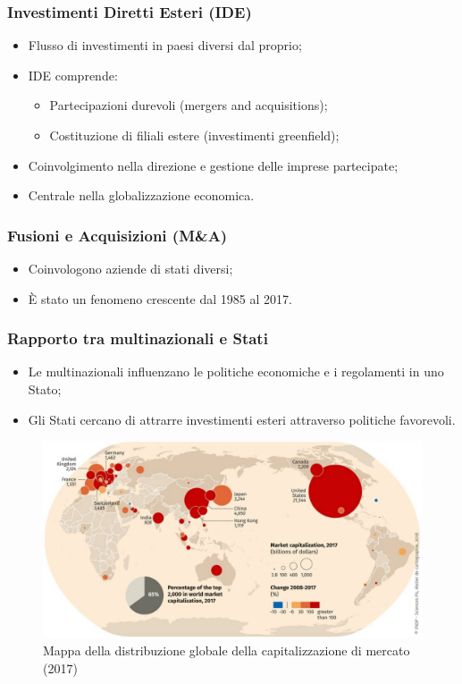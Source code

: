 \documentclass{article}
\begin{document}
\subsubsection{Investimenti Diretti Esteri (IDE)}
\begin{itemize}
    \item Flusso di investimenti in paesi diversi dal proprio;
    \item IDE comprende:
        \begin{itemize}
            \item Partecipazioni durevoli (mergers and acquisitions);
            \item Costituzione di filiali estere (investimenti greenfield);
        \end{itemize}
    \item Coinvolgimento nella direzione e gestione delle imprese partecipate;
    \item Centrale nella globalizzazione economica.
\end{itemize}

\subsubsection{Fusioni e Acquisizioni (M\&A)}
\begin{itemize}
    \item Coinvologono aziende di stati diversi;
    \item È stato un fenomeno crescente dal 1985 al 2017.
\end{itemize}

\subsubsection{Rapporto tra multinazionali e Stati}
\begin{itemize}
    \item Le multinazionali influenzano le politiche economiche e i regolamenti in uno Stato;
    \item Gli Stati cercano di attrarre investimenti esteri attraverso politiche favorevoli.
\end{itemize}
\vspace*{1cm}

\begin{figure}[ht!]
    \begin{center}
        \includegraphics[width=.8\textwidth]{media/cartina_multinazionali.png}
    \end{center}
    \caption*{Mappa della distribuzione globale della capitalizzazione di mercato (2017)}
\end{figure}
\vspace*{1cm}
\end{document}
